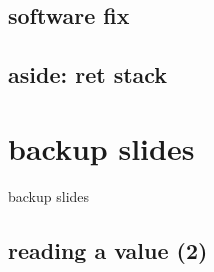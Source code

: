 \subsection{software fix}


\subsection{aside: ret stack}



\section{backup slides}
\begin{frame}{backup slides}
\end{frame}
\subsection{reading a value (2)}



